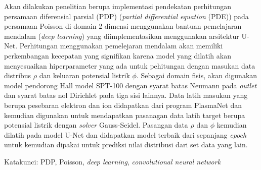 \documentclass{laporanta1actugm}
\begin{document}
\cover

\newpage{}
\tableofcontents
\begin{abstractind}
Akan dilakukan penelitian berupa implementasi pendekatan perhitungan persamaan diferensial parsial (PDP) (\emph{partial differential equation} (PDE)) pada persamaan Poisson di domain 2 dimensi menggunakan bantuan pemelajaran mendalam (\emph{deep learning}) yang diimplementasikan menggunakan arsitektur U-Net. Perhitungan menggunakan pemelejaran mendalam akan memiliki perkembangan kecepatan yang signifikan karena model yang dilatih akan menyesuaikan hiperparameter yang ada untuk pehitungan dengan masukan data distribus $\rho$ dan keluaran potensial listrik $\phi$. Sebagai domain fisis, akan digunakan model pendorong Hall model SPT-100 dengan syarat batas Neumann pada \emph{outlet} dan syarat batas nol Dirichlet pada tiga sisi lainnya. Data latih masukan yang berupa pesebaran elektron dan ion didapatkan dari program PlasmaNet dan kemudian digunakan untuk mendapatkan pasanagan data latih target berupa potensial listrik dengan \emph{solver} Gauss-Seidel. Pasangan data $\rho$ dan $\phi$ kemudian dilatih pada model U-Net dan didapatkan model terbaik dari sepanjang \emph{epoch} untuk kemudian dipakai untuk prediksi nilai distribusi dari set data yang lain.

Katakunci: PDP, Poisson, \emph{deep learning}, \emph{convolutional neural network}
\end{abstractind}



% 
% 
% 

\end{document}
